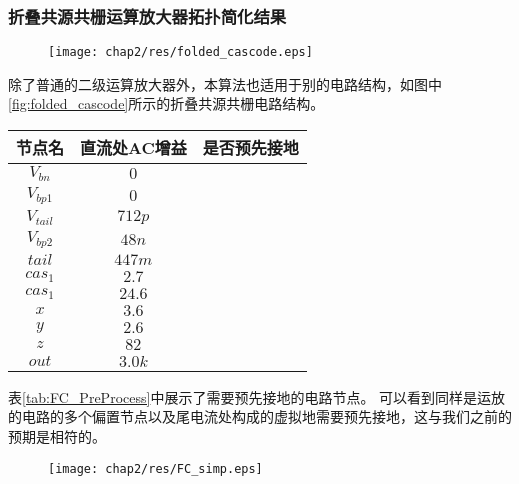 \subsubsection{折叠共源共栅运算放大器拓扑简化结果}
\label{subsubsec:simp:res:cir:fd}

\begin{figure}[!htp]
	\centering
	\texttt{[image: chap2/res/folded\_cascode.eps]}
\end{figure}

除了普通的二级运算放大器外，本算法也适用于别的电路结构，如图中\ref{fig:folded_cascode}所示的折叠共源共栅电路结构。

\begin{table}[!htbp]
	\centering
	\begin{tabular}{c|c|c}
		\hline
		   节点名     & 直流处AC增益 &   是否预先接地   \\ \hline
		 $V_{bn}$  &   $0$   & \checkmark \\
		$V_{bp1}$  &   $0$   & \checkmark \\
		$V_{tail}$ & $712p$  & \checkmark \\
		$V_{bp2}$  &  $48n$  & \checkmark \\
		  $tail$   & $447m$  & \checkmark \\
		 $cas_1$   &  $2.7$  & \texttimes \\
		 $cas_1$   & $24.6$  & \texttimes \\
		   $x$     &  $3.6$  & \texttimes \\
		   $y$     &  $2.6$  & \texttimes \\
		   $z$     &  $82$   & \texttimes \\
		  $out$    & $3.0k$  & \texttimes \\ \hline
	\end{tabular}
\end{table}

表\ref{tab:FC_PreProcess}中展示了需要预先接地的电路节点。
可以看到同样是运放的电路的多个偏置节点以及尾电流处构成的虚拟地需要预先接地，这与我们之前的预期是相符的。

\begin{figure}[!htp]
	\centering
	\texttt{[image: chap2/res/FC\_simp.eps]}
\end{figure}

